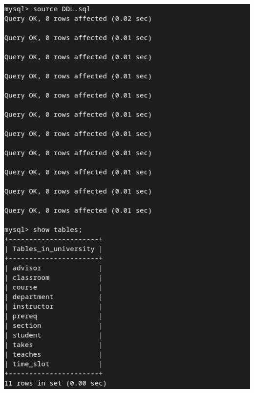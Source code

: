 \documentclass{article}
\begin{document}
\section{}
\begin{center}
    \includegraphics[scale=0.6]{4.png}
\end{center}
\end{document}
